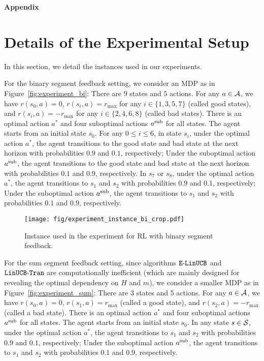 \appendix
\onecolumn
\begin{center}
	\vspace*{0.01em}
	\LARGE{\textbf{Appendix}}
	\vspace*{0.3em}
\end{center}


\section{Details of the Experimental Setup} \label{apx:experimental_setup}

In this section, we detail the instances used in our experiments. 

For the binary segment feedback setting, we consider an MDP as in Figure~\ref{fig:experiment_bi}: There are $9$ states and $5$ actions. For any $a \in \mathcal{A}$, we have $r(s_0,a)=0$, $r(s_i,a)=r_{\max}$ for any $i \in \{1,3,5,7\}$ (called good states), and $r(s_i,a)=-r_{\max}$ for any $i \in \{2,4,6,8\}$ (called bad states).  There is an optimal action $a^*$ and four suboptimal actions $a^{\textup{sub}}$ for all states. The agent starts from an initial state $s_0$. For any $0\leq i \leq 6$, in state $s_i$, under the optimal action $a^*$, the agent transitions to the good state and bad state at the next horizon with probabilities $0.9$ and $0.1$, respectively; Under the suboptimal action $a^{\textup{sub}}$, the agent transitions to the good state and bad state at the next horizon with probabilities $0.1$ and $0.9$, respectively. 
In $s_7$ or $s_8$, under the optimal action $a^*$, the agent transitions to $s_1$ and $s_2$ with probabilities $0.9$ and $0.1$, respectively; Under the suboptimal action $a^{\textup{sub}}$, the agent transitions to $s_1$ and $s_2$ with probabilities $0.1$ and $0.9$, respectively.

\begin{figure}[h]
	\centering
	\texttt{[image: fig/experiment\_instance\_bi\_crop.pdf]} \label{fig:lb_instance_bi}
	\caption{Instance used in the experiment for RL with binary segment feedback.
	}
\end{figure}

For the sum segment feedback setting, since algorithms $\mathtt{E\mbox{-}LinUCB}$ and $\mathtt{LinUCB\mbox{-}Tran}$ are computationally inefficient (which are mainly designed for revealing the optimal dependency on $H$ and $m$), we consider a smaller MDP as in Figure~\ref{fig:experiment_sum}: There are $3$ states and $5$ actions. For any $a \in \mathcal{A}$, we have $r(s_0,a)=0$, $r(s_1,a)=r_{\max}$ (called a good state), and $r(s_2,a)=-r_{\max}$ (called a bad state). There is an optimal action $a^*$ and four suboptimal actions $a^{\textup{sub}}$ for all states. The agent starts from an initial state $s_0$. In any state $s \in \mathcal{S}$, under the optimal action $a^*$, the agent transitions to $s_1$ and $s_2$ with probabilities $0.9$ and $0.1$, respectively; Under the suboptimal action $a^{\textup{sub}}$, the agent transitions to $s_1$ and $s_2$ with probabilities $0.1$ and $0.9$, respectively. 

